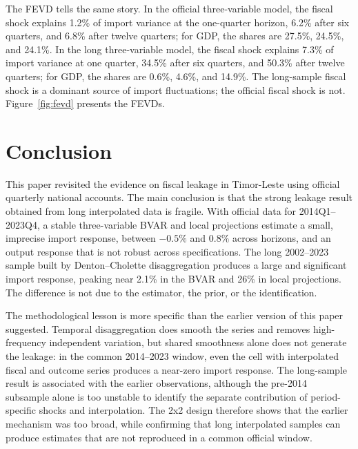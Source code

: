 \documentclass[11pt,a4paper]{article}
\begin{document}
The FEVD tells the same story. In the official three-variable model, the fiscal shock explains 1.2\% of import variance at the one-quarter horizon, 6.2\% after six quarters, and 6.8\% after twelve quarters; for GDP, the shares are 27.5\%, 24.5\%, and 24.1\%. In the long three-variable model, the fiscal shock explains 7.3\% of import variance at one quarter, 34.5\% after six quarters, and 50.3\% after twelve quarters; for GDP, the shares are 0.6\%, 4.6\%, and 14.9\%. The long-sample fiscal shock is a dominant source of import fluctuations; the official fiscal shock is not. Figure~\ref{fig:fevd} presents the FEVDs.

\section{Conclusion}
\label{sec:conclusion}

This paper revisited the evidence on fiscal leakage in Timor-Leste using official quarterly national accounts. The main conclusion is that the strong leakage result obtained from long interpolated data is fragile. With official data for 2014Q1--2023Q4, a stable three-variable BVAR and local projections estimate a small, imprecise import response, between $-0.5\%$ and $0.8\%$ across horizons, and an output response that is not robust across specifications. The long 2002--2023 sample built by Denton--Cholette disaggregation produces a large and significant import response, peaking near 2.1\% in the BVAR and 26\% in local projections. The difference is not due to the estimator, the prior, or the identification.

The methodological lesson is more specific than the earlier version of this paper suggested. Temporal disaggregation does smooth the series and removes high-frequency independent variation, but shared smoothness alone does not generate the leakage: in the common 2014--2023 window, even the cell with interpolated fiscal and outcome series produces a near-zero import response. The long-sample result is associated with the earlier observations, although the pre-2014 subsample alone is too unstable to identify the separate contribution of period-specific shocks and interpolation. The 2x2 design therefore shows that the earlier mechanism was too broad, while confirming that long interpolated samples can produce estimates that are not reproduced in a common official window.
\end{document}
